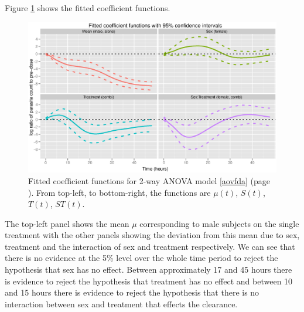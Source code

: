 Figure \ref{fdcoef} shows the fitted coefficient functions.
\begin{figure}[p]
\includegraphics[width=150mm]{fdcoef.eps} 
\caption{Fitted coefficient functions for 2-way ANOVA model \ref{aovfda} (page \pageref{aovfda}). From top-left, to bottom-right, the functions are $\mu(t)$, $S(t)$, $T(t)$, $ST(t)$.}
\label{fdcoef}
\end{figure}
 The top-left panel shows the mean $\mu$ corresponding to male subjects on the single treatment with the other panels showing the deviation from this mean due to sex, treatment and the interaction of sex and treatment respectively. We can see that there is no evidence at the 5\% level over the whole time period to reject the hypothesis that sex has no effect. Between approximately 17 and 45 hours there is evidence to reject the hypothesis that treatment has no effect and between 10 and 15 hours there is evidence to reject the hypothesis that there is no interaction between sex and treatment that effects the clearance.
 

